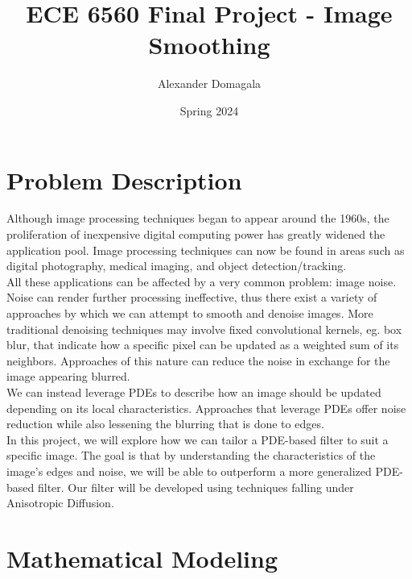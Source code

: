 \documentclass{article}
\title{\textbf{ECE 6560 Final Project - Image Smoothing}}
\author{Alexander Domagala}
\date{Spring 2024}
\begin{document}
  \maketitle

  \section{Problem Description}
  Although image processing techniques began to appear around the 1960s, the proliferation of inexpensive
  digital computing power has greatly widened the application pool. Image processing techniques
  can now be found in areas such as digital photography, medical imaging, and object detection/tracking.\\

  \noindent
  All these applications can be affected by a very common problem: image noise.
  Noise can render further processing ineffective, thus there exist a variety of approaches by which
  we can attempt to smooth and denoise images. More traditional denoising techniques
  may involve fixed convolutional kernels, eg. box blur, that indicate how a specific pixel
  can be updated as a weighted sum of its neighbors. Approaches of this nature can reduce the noise in
  exchange for the image appearing blurred.\\

  \noindent
  We can instead leverage PDEs to describe how an image should be updated depending on its local characteristics.
  Approaches that leverage PDEs offer noise reduction while also lessening the blurring that is done to edges.\\

  \noindent
  In this project, we will explore how we can tailor a PDE-based filter to suit a specific image.
  The goal is that by understanding the characteristics of the image's edges and noise, we
  will be able to outperform a more generalized PDE-based filter. Our filter will be developed
  using techniques falling under Anisotropic Diffusion.




  \newpage
  \section{Mathematical Modeling}
\end{document}
